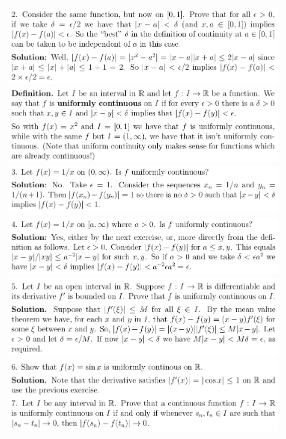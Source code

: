 \documentclass[8pt,landscape]{article}
\begin{document}
\begin{multicols}{3}
    \includegraphics[width=270]{020.png} \\
    \includegraphics[width=270]{021.png} \\
    \includegraphics[width=270]{022.png} \\
    \includegraphics[width=270]{023.png} \\
    \includegraphics[width=270]{024.png} \\
    \includegraphics[width=270]{025.png} \\

\end{multicols}
\end{document}
